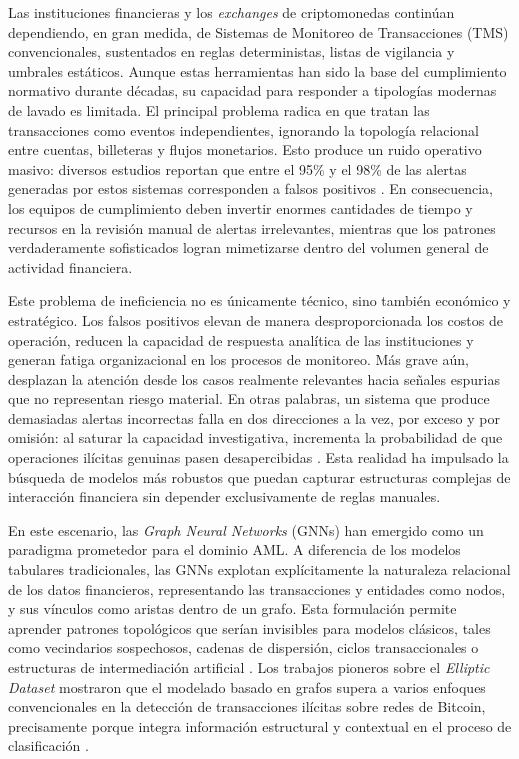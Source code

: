 \bigskip

Las instituciones financieras y los \textit{exchanges} de criptomonedas continúan dependiendo, en gran medida, de Sistemas de Monitoreo de Transacciones (TMS) convencionales, sustentados en reglas deterministas, listas de vigilancia y umbrales estáticos. Aunque estas herramientas han sido la base del cumplimiento normativo durante décadas, su capacidad para responder a tipologías modernas de lavado es limitada. El principal problema radica en que tratan las transacciones como eventos independientes, ignorando la topología relacional entre cuentas, billeteras y flujos monetarios. Esto produce un ruido operativo masivo: diversos estudios reportan que entre el 95\% y el 98\% de las alertas generadas por estos sistemas corresponden a falsos positivos \cite{Unagar2025SurveyXAI}. En consecuencia, los equipos de cumplimiento deben invertir enormes cantidades de tiempo y recursos en la revisión manual de alertas irrelevantes, mientras que los patrones verdaderamente sofisticados logran mimetizarse dentro del volumen general de actividad financiera.

\bigskip

Este problema de ineficiencia no es únicamente técnico, sino también económico y estratégico. Los falsos positivos elevan de manera desproporcionada los costos de operación, reducen la capacidad de respuesta analítica de las instituciones y generan fatiga organizacional en los procesos de monitoreo. Más grave aún, desplazan la atención desde los casos realmente relevantes hacia señales espurias que no representan riesgo material. En otras palabras, un sistema que produce demasiadas alertas incorrectas falla en dos direcciones a la vez, por exceso y por omisión: al saturar la capacidad investigativa, incrementa la probabilidad de que operaciones ilícitas genuinas pasen desapercibidas \cite{Subashi2024CryptocurrenciesLaundering, Unagar2025SurveyXAI}. Esta realidad ha impulsado la búsqueda de modelos más robustos que puedan capturar estructuras complejas de interacción financiera sin depender exclusivamente de reglas manuales.

\bigskip

En este escenario, las \textit{Graph Neural Networks} (GNNs) han emergido como un paradigma prometedor para el dominio AML. A diferencia de los modelos tabulares tradicionales, las GNNs explotan explícitamente la naturaleza relacional de los datos financieros, representando las transacciones y entidades como nodos, y sus vínculos como aristas dentro de un grafo. Esta formulación permite aprender patrones topológicos que serían invisibles para modelos clásicos, tales como vecindarios sospechosos, cadenas de dispersión, ciclos transaccionales o estructuras de intermediación artificial \cite{Weber2019Anti-MoneyForensics, Lawal2025AnDataset}. Los trabajos pioneros sobre el \textit{Elliptic Dataset} mostraron que el modelado basado en grafos supera a varios enfoques convencionales en la detección de transacciones ilícitas sobre redes de Bitcoin, precisamente porque integra información estructural y contextual en el proceso de clasificación \cite{Weber2019Anti-MoneyForensics}.

